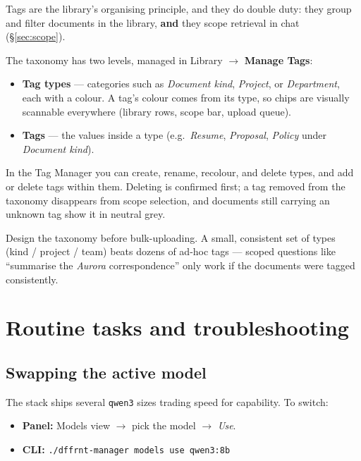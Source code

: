 \documentclass[11pt,letterpaper]{article}
\let\oldsection\section
\renewcommand{\section}{\vspace{1em}\oldsection}
\begin{document}
Tags are the library's organising principle, and they do double duty: they
group and filter documents in the library, \textbf{and} they scope retrieval
in chat (\S\ref{sec:scope}).

The taxonomy has two levels, managed in Library $\rightarrow$ \textbf{Manage
Tags}:

\begin{itemize}
  \item \textbf{Tag types} --- categories such as \emph{Document kind},
        \emph{Project}, or \emph{Department}, each with a colour. A tag's
        colour comes from its type, so chips are visually scannable
        everywhere (library rows, scope bar, upload queue).
  \item \textbf{Tags} --- the values inside a type (e.g.\ \emph{Resume},
        \emph{Proposal}, \emph{Policy} under \emph{Document kind}).
\end{itemize}

In the Tag Manager you can create, rename, recolour, and delete types, and
add or delete tags within them. Deleting is confirmed first; a tag removed
from the taxonomy disappears from scope selection, and documents still
carrying an unknown tag show it in neutral grey.

\begin{gtip}
Design the taxonomy before bulk-uploading. A small, consistent set of types
(kind / project / team) beats dozens of ad-hoc tags --- scoped questions like
``summarise the \emph{Aurora} correspondence'' only work if the documents
were tagged consistently.
\end{gtip}

\section{Routine tasks and troubleshooting}

\subsection{Swapping the active model}

The stack ships several \texttt{qwen3} sizes trading speed for capability.
To switch:

\begin{itemize}
  \item \textbf{Panel:} Models view $\rightarrow$ pick the model
        $\rightarrow$ \emph{Use}.
  \item \textbf{CLI:} \texttt{./dffrnt-manager models use qwen3:8b}
\end{itemize}
\end{document}
